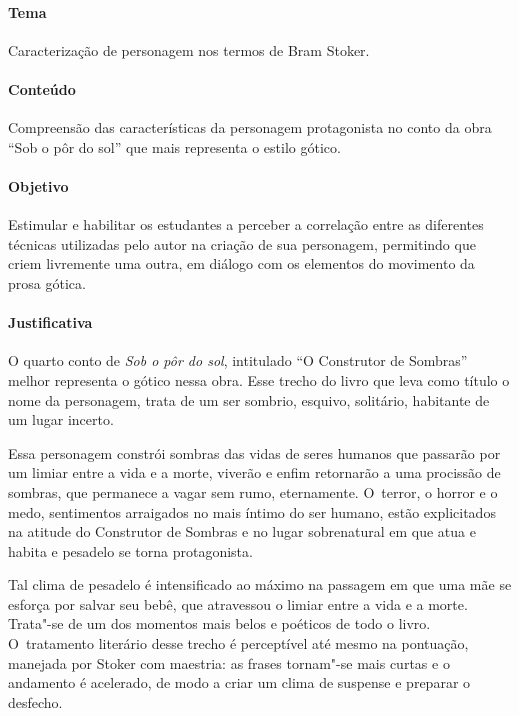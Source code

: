\documentclass[12pt]{extarticle}
\begin{document}

\paragraph{Tema} Caracterização de personagem nos termos de Bram Stoker.

\paragraph{Conteúdo} Compreensão das características da personagem protagonista 
no conto da obra ``Sob o pôr do sol'' que mais representa o estilo gótico.  

\paragraph{Objetivo} Estimular e habilitar os estudantes a perceber a 
correlação entre as diferentes técnicas utilizadas pelo autor na criação de sua 
personagem, permitindo que criem livremente uma outra, em diálogo com os elementos 
do movimento da prosa gótica. 

\paragraph{Justificativa} O quarto conto de \textit{Sob o pôr do sol}, intitulado 
``O Construtor de Sombras'' melhor representa o gótico nessa obra. Esse trecho do livro 
que leva como título o nome da personagem, trata de um ser sombrio, esquivo, solitário, 
habitante de um lugar incerto. 

Essa personagem constrói sombras das vidas de seres humanos que passarão por um limiar entre 
a vida e  a morte, viverão e enfim retornarão a uma procissão de sombras, que permanece a 
vagar sem rumo, eternamente. O~terror, o horror e o medo, sentimentos arraigados
no mais íntimo do ser humano, estão explicitados na atitude do
Construtor de Sombras e no lugar sobrenatural em que atua e habita e pesadelo se
torna protagonista. 

Tal clima de pesadelo é intensificado ao máximo na
passagem em que uma mãe se esforça por salvar seu bebê, que atravessou o
limiar entre a vida e a morte. Trata"-se de um dos momentos mais belos e poéticos de todo 
o livro. O~tratamento literário desse trecho é perceptível até mesmo na pontuação, manejada
por Stoker com maestria: as frases tornam"-se mais curtas e o andamento é
acelerado, de modo a criar um clima de suspense e preparar o desfecho.
\end{document}
